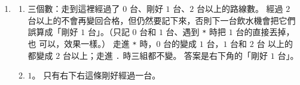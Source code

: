 \begin{enumerate}
\item
\begin{enumerate}
\item 三個數：走到這裡經過了 $0$ 台、剛好 $1$ 台、$2$ 台以上的路線數。 經過 $2$
台以上的不會再變回合格，但仍然要記下來，否則下一台飲水機會把它們誤算成「剛好
$1$ 台」。（只記 $0$ 台和 $1$ 台、遇到 \texttt{*} 時把 $1$ 台的直接丟掉，也
可以，效果一樣。） 走進 \texttt{*} 時，$0$ 台的變成 $1$ 台，$1$ 台和 $2$ 台
以上的都變成 $2$ 台以上；走進 \texttt{.} 時三組都不變。 答案是右下角的「剛好
$1$ 台」。
\item $1$。 只有右下右這條剛好經過一台。
\end{enumerate}
\end{enumerate}
